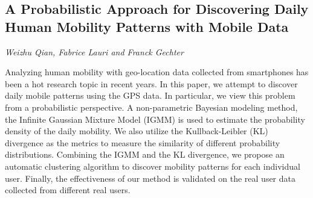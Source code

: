\documentclass[../booklet.tex]{subfiles}
\begin{document}
\subsection[A Probabilistic Approach for Discovering Daily Human Mobility Patterns with Mobile Data. {\it Weizhu Qian, Fabrice Lauri and Franck Gechter}]{A Probabilistic Approach for Discovering Daily Human Mobility Patterns with Mobile Data}
  

\begin{center}
  {\it Weizhu Qian, Fabrice Lauri and Franck Gechter}
\end{center}



Analyzing human mobility with geo-location data collected from smartphones has been a hot research topic in recent years. In this paper, we attempt to discover daily mobile patterns using the GPS data. In particular, we view this problem from a probabilistic perspective. A non-parametric Bayesian modeling method, the Infinite Gaussian Mixture Model (IGMM) is used to estimate the probability density of the daily mobility. We also utilize the Kullback-Leibler (KL) divergence as the metrics to measure the similarity of different probability distributions. Combining the IGMM and the KL divergence, we propose an automatic clustering algorithm to discover mobility patterns for each individual user. Finally, the effectiveness of our method is validated on the real user data collected from different real users. 

\end{document}
